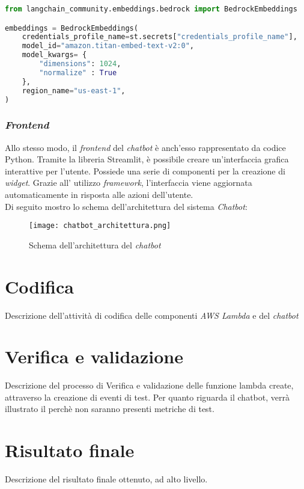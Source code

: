 \begin{lstlisting}[caption=Configurazione con LangChain di un servizio di \gls{embedding-g} offerto da \gls{aws}, label=lst:backendChatbot, language=Python]
from langchain_community.embeddings.bedrock import BedrockEmbeddings

embeddings = BedrockEmbeddings(
    credentials_profile_name=st.secrets["credentials_profile_name"],
    model_id="amazon.titan-embed-text-v2:0",
    model_kwargs= {
        "dimensions": 1024,
        "normalize" : True
    },
    region_name="us-east-1",
)
\end{lstlisting}

\subsubsection{\textit{Frontend}}
Allo stesso modo, il \textit{frontend} del \textit{chatbot} è anch'esso rappresentato da codice Python. Tramite la libreria Streamlit, è possibile creare un'interfaccia grafica interattive per l'utente. Possiede una serie di componenti per la creazione di \textit{widget}. Grazie all' utilizzo \textit{framework}, l'interfaccia viene aggiornata automaticamente in risposta alle azioni dell'utente. \\
\noindent
Di seguito mostro lo schema dell'architettura del sistema \textit{Chatbot}:
\begin{figure}[H]
    \centering
    \texttt{[image: chatbot\_architettura.png]}
    \caption{Schema dell'architettura del \textit{chatbot}}
    \label{fig:architetturaChatbot}
\end{figure}

\section{Codifica}
Descrizione dell'attività di codifica delle componenti \textit{AWS Lambda} e del \textit{chatbot}
\section{Verifica e validazione}
Descrizione del processo di Verifica e validazione delle funzione lambda create, attraverso la creazione di eventi di test.
Per quanto riguarda il chatbot, verrà illustrato il perchè non saranno presenti metriche di test.

\section{Risultato finale}
Descrizione del risultato finale ottenuto, ad alto livello.